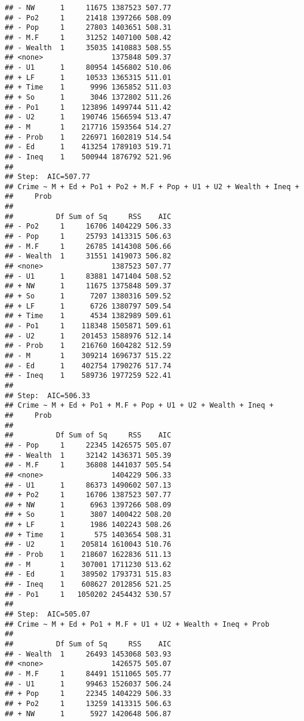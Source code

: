 \documentclass[
]{article}
\begin{document}
\begin{verbatim}
## - NW      1     11675 1387523 507.77
## - Po2     1     21418 1397266 508.09
## - Pop     1     27803 1403651 508.31
## - M.F     1     31252 1407100 508.42
## - Wealth  1     35035 1410883 508.55
## <none>                1375848 509.37
## - U1      1     80954 1456802 510.06
## + LF      1     10533 1365315 511.01
## + Time    1      9996 1365852 511.03
## + So      1      3046 1372802 511.26
## - Po1     1    123896 1499744 511.42
## - U2      1    190746 1566594 513.47
## - M       1    217716 1593564 514.27
## - Prob    1    226971 1602819 514.54
## - Ed      1    413254 1789103 519.71
## - Ineq    1    500944 1876792 521.96
## 
## Step:  AIC=507.77
## Crime ~ M + Ed + Po1 + Po2 + M.F + Pop + U1 + U2 + Wealth + Ineq + 
##     Prob
## 
##          Df Sum of Sq     RSS    AIC
## - Po2     1     16706 1404229 506.33
## - Pop     1     25793 1413315 506.63
## - M.F     1     26785 1414308 506.66
## - Wealth  1     31551 1419073 506.82
## <none>                1387523 507.77
## - U1      1     83881 1471404 508.52
## + NW      1     11675 1375848 509.37
## + So      1      7207 1380316 509.52
## + LF      1      6726 1380797 509.54
## + Time    1      4534 1382989 509.61
## - Po1     1    118348 1505871 509.61
## - U2      1    201453 1588976 512.14
## - Prob    1    216760 1604282 512.59
## - M       1    309214 1696737 515.22
## - Ed      1    402754 1790276 517.74
## - Ineq    1    589736 1977259 522.41
## 
## Step:  AIC=506.33
## Crime ~ M + Ed + Po1 + M.F + Pop + U1 + U2 + Wealth + Ineq + 
##     Prob
## 
##          Df Sum of Sq     RSS    AIC
## - Pop     1     22345 1426575 505.07
## - Wealth  1     32142 1436371 505.39
## - M.F     1     36808 1441037 505.54
## <none>                1404229 506.33
## - U1      1     86373 1490602 507.13
## + Po2     1     16706 1387523 507.77
## + NW      1      6963 1397266 508.09
## + So      1      3807 1400422 508.20
## + LF      1      1986 1402243 508.26
## + Time    1       575 1403654 508.31
## - U2      1    205814 1610043 510.76
## - Prob    1    218607 1622836 511.13
## - M       1    307001 1711230 513.62
## - Ed      1    389502 1793731 515.83
## - Ineq    1    608627 2012856 521.25
## - Po1     1   1050202 2454432 530.57
## 
## Step:  AIC=505.07
## Crime ~ M + Ed + Po1 + M.F + U1 + U2 + Wealth + Ineq + Prob
## 
##          Df Sum of Sq     RSS    AIC
## - Wealth  1     26493 1453068 503.93
## <none>                1426575 505.07
## - M.F     1     84491 1511065 505.77
## - U1      1     99463 1526037 506.24
## + Pop     1     22345 1404229 506.33
## + Po2     1     13259 1413315 506.63
## + NW      1      5927 1420648 506.87

\end{verbatim}
\end{document}
